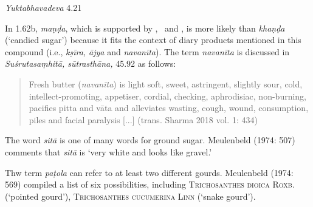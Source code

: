 \begin{ekdosis}
\begin{testimonia}[hp01_062]
\begin{versinnote}
\tl{\var{°phalapatraja° ] phalādika N,n1,J. yamīndra° ] yatīndra° N,n1,J}\\!}
\end{versinnote}

\emph{Yuktabhavadeva} 4.21

\begin{versinnote}
\end{versinnote}

\end{testimonia}

\begin{philcomm}[hp01_062]
In 1.62b, \emph{maṇḍa}, which is supported by \textalpha, \textbeta\ and \textgamma, is more likely than \emph{khaṇḍa} (`candied sugar') because it fits the context of diary products mentioned in this compound (i.e., \emph{kṣīra, ājya} and \emph{navanīta}). The term \emph{navanīta} is discussed in \emph{Suśrutasaṃhitā, sūtrasthāna,} 45.92 as follows:
\begin{quote}
Fresh butter (\emph{navanīta}) is light soft, sweet, astringent, slightly sour, cold, intellect-promoting, appetiser, cordial, checking, aphrodisiac, non-burning, pacifies pitta and vāta and alleviates wasting, cough, wound, consumption, piles and facial paralysis [...] (trans. Sharma 2018 vol. 1: 434)
\end{quote}

The word \emph{sitā} is one of many words for ground sugar. Meulenbeld (1974: 507) comments that \emph{sitā} is `very white and looks like gravel.'

Thw term \emph{paṭola} can refer to at least two different gourds. Meulenbeld (1974: 569) compiled a list of six possibilities, including \textsc{Trichosanthes dioica} \textsc{Roxb}. (`pointed gourd'), \textsc{Trichosanthes cucumerina} \textsc{Linn} (`snake gourd').


\end{philcomm}
\end{ekdosis}
